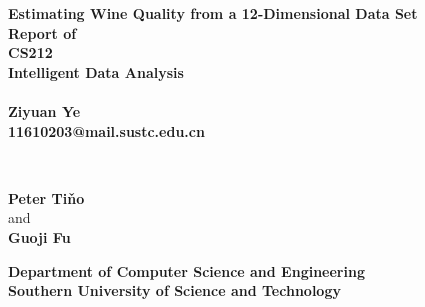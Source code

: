 \documentclass[titlepage,a4paper,12pt,thmsb]{report}
\begin{document}
\begin{titlepage}
\thispagestyle{empty}
\begin{center}
{\LARGE \bf{ Estimating Wine Quality from a 12-Dimensional
Data Set}} \\
\vspace{1.5cm}
\large \bf{ Report of } \\
\large \bf{CS212\\ Intelligent Data Analysis} \\
\vspace{0.3cm}
\large {} \\
\vspace{0.3cm}
\rm
{\large \bf {Ziyuan Ye}}\\
\vspace{0.3cm}
\bf{11610203@mail.sustc.edu.cn} \\

\vspace{1cm}

{\large{}} \\
\vspace{.5cm}

\hspace{.05cm} {\bf {Peter Ti\v{n}o}}\\
\hspace{.05cm} {\sc and}\\
\hspace{.05cm} {\bf {Guoji Fu}}\\

\begin{figure}[h]
{\par}
\end{figure}
\large{\bf Department of Computer Science and Engineering} \\
\vskip 0.5cm
\Large{\bf Southern University of Science and Technology}\\
{\centering {}}
\end{center}
\pagebreak
\end{titlepage}
\end{document}
